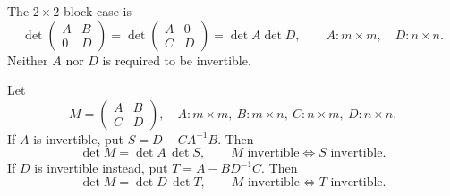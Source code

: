 The \(2\times2\) block case is
\[
\det\begin{pmatrix}A&B\\0&D\end{pmatrix}
=\det\begin{pmatrix}A&0\\C&D\end{pmatrix}
=\det A\det D,
\qquad A:m\times m,\quad D:n\times n.
\]
Neither \(A\) nor \(D\) is required to be invertible.

\begin{theorem}\label{thm:05:schur}
Let
\[
M=\begin{pmatrix}A&B\\C&D\end{pmatrix},
\quad A:m\times m,\ B:m\times n,\ C:n\times m,\ D:n\times n.
\]
If \(A\) is invertible, put \(S=D-CA^{-1}B\). Then
\[
\det M=\det A\,\det S,\qquad
M\text{ invertible}\Longleftrightarrow S\text{ invertible}.
\]
If \(D\) is invertible instead, put \(T=A-BD^{-1}C\). Then
\[
\det M=\det D\,\det T,\qquad
M\text{ invertible}\Longleftrightarrow T\text{ invertible}.
\]
\end{theorem}
